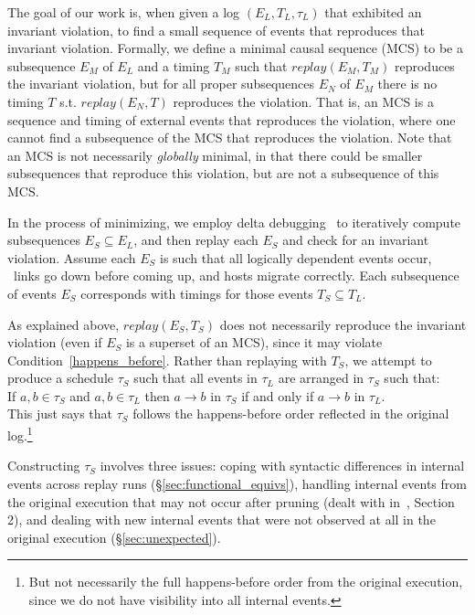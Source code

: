 The goal of our work is, when given a log $(E_L, T_L, \tau_L)$ that exhibited an
invariant violation, to find a small sequence of events that reproduces that
invariant violation. Formally, we define a minimal causal sequence (MCS)
to be a subsequence $E_M$
of $E_L$ and a timing $T_M$ such
that $replay(E_M,T_M)$ reproduces the invariant violation, but for all proper
subsequences $E_N$ of $E_M$
there is no timing $T$ s.t. $replay(E_N,T)$ reproduces the violation.
That is, an MCS is a sequence and timing of external events that reproduces the violation,
where one cannot find a subsequence of the MCS that reproduces the violation.
Note that an MCS is not necessarily {\em globally} minimal, in that there could be smaller
subsequences that reproduce this violation, but are not a subsequence of this MCS.

In the process of minimizing, we employ delta debugging~\cite{Zeller:1999:YMP:318773.318946}
to iteratively compute
subsequences $E_S\subseteq E_L$, and then replay each $E_S$ and check for an
invariant violation. Assume each $E_S$ is such
that all logically dependent events occur, \eg~links go down before coming up,
and hosts migrate correctly. Each subsequence of events $E_S$ corresponds with
timings for those events $T_S\subseteq T_L$.

As explained above, $replay(E_S, T_S)$ does not necessarily reproduce the
invariant violation (even if $E_S$ is a superset of an MCS), since it may
violate Condition~\ref{happens_before}. Rather than replaying with $T_S$, we attempt to produce a
schedule $\tau_S$ such that all events in $\tau_L$ are arranged in $\tau_S$
such that: \\

If $a, b\in \tau_S$ and $a, b\in \tau_L$ then $a \rightarrow b$ in $\tau_S$ if
and only if $a \rightarrow b$ in $\tau_L$. \\

\noindent This just says that $\tau_S$ follows the happens-before order reflected in the
original log.\footnote{But not necessarily the full happens-before order from
the original execution, since we do not have visibility into all internal
events.}

Constructing $\tau_S$ involves three issues: coping with syntactic differences in internal
events across replay runs (\S\ref{sec:functional_equivs}),
handling internal events from the original
execution that may not occur after pruning (dealt with in~\cite{sts}, Section 2),
and dealing with new internal events that were not
observed at all in the original execution (\S\ref{sec:unexpected}).

